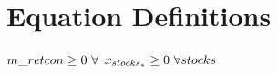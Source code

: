 \documentclass[11pt]{article}
\begin{document}
\section*{Equation Definitions}

\bigskip
$m\_retcon\geq 0 ~ \forall \\$
$x_{stocks_{*}}\geq 0 ~ \forall stocks\\$
\end{document}
